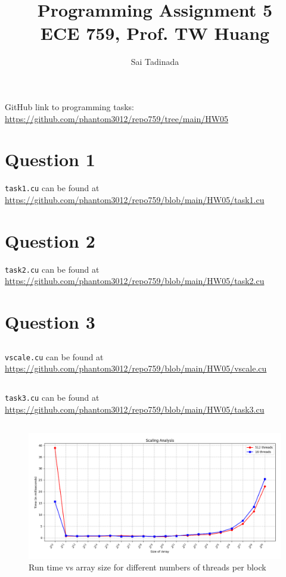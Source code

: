 \documentclass[12pt]{article}
\title{Programming Assignment 5 \\ \small{ECE 759, Prof. TW Huang}}
\author{Sai Tadinada}
\date{}
\begin{document}
\maketitle

GitHub link to programming tasks: \\ \url{https://github.com/phantom3012/repo759/tree/main/HW05}

\section{Question 1}
\texttt{task1.cu} can be found at \url{https://github.com/phantom3012/repo759/blob/main/HW05/task1.cu}

\section{Question 2}
\texttt{task2.cu} can be found at \url{https://github.com/phantom3012/repo759/blob/main/HW05/task2.cu}
\section{Question 3}
\subsection{}
\texttt{vscale.cu} can be found at \url{https://github.com/phantom3012/repo759/blob/main/HW05/vscale.cu}
\subsection{}
\texttt{task3.cu} can be found at \url{https://github.com/phantom3012/repo759/blob/main/HW05/task3.cu}
\newpage
\subsection{}
\begin{figure}[ht]
    \centering
    \includegraphics[width=\textwidth]{time_vs_size.png}
    \caption{Run time vs array size for different numbers of threads per block}
\end{figure}
\end{document}
